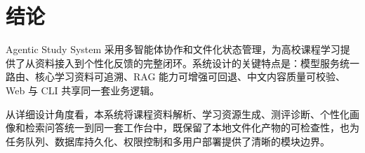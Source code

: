 \documentclass[UTF8,fontset=windows,zihao=-4,openany]{ctexrep}
\begin{document}
\chapter{结论}

Agentic Study System 采用多智能体协作和文件化状态管理，为高校课程学习提供了从资料接入到个性化反馈的完整闭环。系统设计的关键特点是：模型服务统一路由、核心学习资料可追溯、RAG 能力可增强可回退、中文内容质量可校验、Web 与 CLI 共享同一套业务逻辑。

从详细设计角度看，本系统将课程资料解析、学习资源生成、测评诊断、个性化画像和检索问答统一到同一套工作台中，既保留了本地文件化产物的可检查性，也为任务队列、数据库持久化、权限控制和多用户部署提供了清晰的模块边界。
\end{document}
